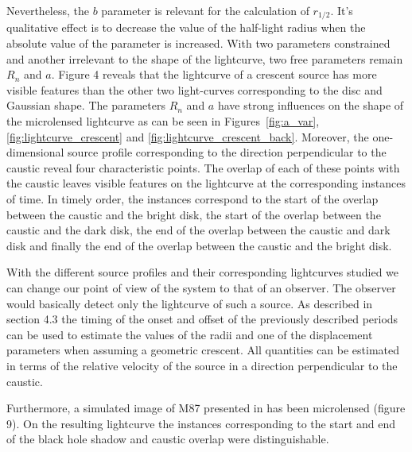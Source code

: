 \documentclass[usenatbib]{mn2e}
\begin{document}
Nevertheless, the $b$ parameter is relevant for the calculation of
$r_{1/2}$.  It's qualitative effect is to decrease the value of the
half-light radius when the absolute value of the parameter is
increased.  With two parameters constrained and another irrelevant to
the shape of the lightcurve, two free parameters remain $R_n$ and $a$.
Figure 4 reveals that the lightcurve of a crescent source has more
visible features than the other two light-curves corresponding to the
disc and Gaussian shape. The parameters $R_n$ and $a$ have strong
influences on the shape of the microlensed lightcurve as can be seen
in Figures~\ref{fig:a_var}, \ref{fig:lightcurve_crescent} and
\ref{fig:lightcurve_crescent_back}.  Moreover, the one-dimensional
source profile corresponding to the direction perpendicular to the
caustic reveal four characteristic points. The overlap of each of
these points with the caustic leaves visible features on the
lightcurve at the corresponding instances of time. In timely order,
the instances correspond to the start of the overlap between the
caustic and the bright disk, the start of the overlap between the
caustic and the dark disk, the end of the overlap between the caustic
and dark disk and finally the end of the overlap between the caustic
and the bright disk.

With the different source profiles and their corresponding lightcurves studied we can change our point of view of the system to that of an observer. 
The observer would basically detect only the lightcurve of such a source. As described in section 4.3 the timing of the onset and offset of the previously 
described periods can be used to estimate the values of the radii and one of the displacement parameters when assuming a geometric crescent. 
All quantities can be estimated in terms of the relative velocity of the source in a direction perpendicular to the caustic.


Furthermore, a simulated image of M87 presented in \citep{2012MNRAS.421.1517D} has been microlensed (figure 9). On the resulting lightcurve the instances 
corresponding to the start and end of the black hole shadow and caustic overlap were distinguishable.
    
\end{document}
